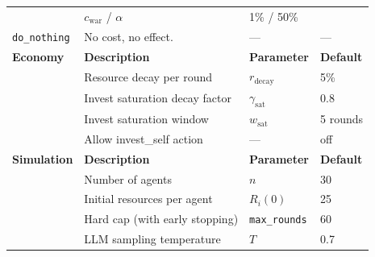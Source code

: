 \begin{table}[ht]
\begin{tabular}{lp{6.2cm}ll}
    & $c_{\text{war}}$ / $\alpha$
    & 1\% / 50\% \\[6pt]
\texttt{do\_nothing}
    & No cost, no effect.
    & ---
    & --- \\[6pt]
\hline
\textbf{Economy} & \textbf{Description} & \textbf{Parameter} & \textbf{Default} \\
\hline
    & Resource decay per round & $r_{\text{decay}}$ & 5\% \\
    & Invest saturation decay factor & $\gamma_{\text{sat}}$ & 0.8 \\
    & Invest saturation window & $w_{\text{sat}}$ & 5 rounds \\
    & Allow invest\_self action & --- & off \\
\hline
\textbf{Simulation} & \textbf{Description} & \textbf{Parameter} & \textbf{Default} \\
\hline
    & Number of agents & $n$ & 30 \\
    & Initial resources per agent & $R_i(0)$ & 25 \\
    & Hard cap (with early stopping) & \texttt{max\_rounds} & 60 \\
    & LLM sampling temperature & $T$ & 0.7 \\
\hline
\end{tabular}
\end{table}

